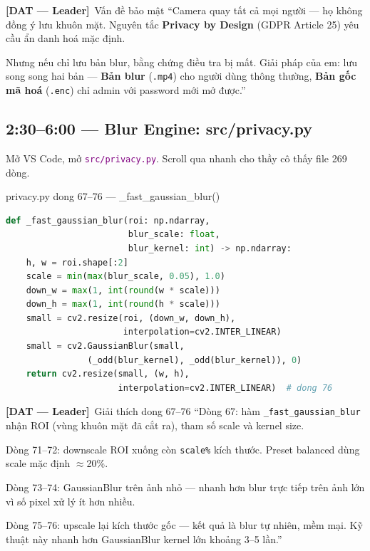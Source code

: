 \documentclass[12pt, a4paper]{article}
\newcommand{\dat}{\textcolor{BrickRed}{\textbf{[DAT --- Leader]}}}
\newcommand{\fpath}[1]{\texttt{\textcolor{purple}{#1}}}
\begin{document}
\begin{dialog}{\dat\ Vấn đề bảo mật}
``Camera quay tất cả mọi người --- họ không đồng ý lưu khuôn mặt.
Nguyên tắc \textbf{Privacy by Design} (GDPR Article 25) yêu cầu ẩn danh hoá mặc định.

Nhưng nếu chỉ lưu bản blur, bằng chứng điều tra bị mất.
Giải pháp của em: lưu song song hai bản ---
\textbf{Bản blur} (\texttt{.mp4}) cho người dùng thông thường,
\textbf{Bản gốc mã hoá} (\texttt{.enc}) chỉ admin với password mới mở được.''
\end{dialog}

\subsection{2:30--6:00 --- Blur Engine: src/privacy.py}

\begin{action}
Mở VS Code, mở \fpath{src/privacy.py}.
Scroll qua nhanh cho thầy cô thấy file 269 dòng.
\end{action}

\begin{codestep}{privacy.py dong 67--76 --- \_fast\_gaussian\_blur()}
\begin{lstlisting}[language=Python, firstnumber=67]
def _fast_gaussian_blur(roi: np.ndarray,
                        blur_scale: float,
                        blur_kernel: int) -> np.ndarray:
    h, w = roi.shape[:2]
    scale = min(max(blur_scale, 0.05), 1.0)
    down_w = max(1, int(round(w * scale)))
    down_h = max(1, int(round(h * scale)))
    small = cv2.resize(roi, (down_w, down_h),
                       interpolation=cv2.INTER_LINEAR)
    small = cv2.GaussianBlur(small,
                (_odd(blur_kernel), _odd(blur_kernel)), 0)
    return cv2.resize(small, (w, h),
                      interpolation=cv2.INTER_LINEAR)  # dong 76
\end{lstlisting}
\end{codestep}

\begin{dialog}{\dat\ Giải thích dong 67--76}
``Dòng 67: hàm \texttt{\_fast\_gaussian\_blur} nhận ROI (vùng khuôn mặt đã cắt ra), tham số scale và kernel size.

Dòng 71--72: downscale ROI xuống còn \texttt{scale\%} kích thước.
Preset balanced dùng scale mặc định $\approx$20\%.

Dòng 73--74: GaussianBlur trên ảnh nhỏ --- nhanh hơn blur trực tiếp trên ảnh lớn
vì số pixel xử lý ít hơn nhiều.

Dòng 75--76: upscale lại kích thước gốc --- kết quả là blur tự nhiên, mềm mại.
Kỹ thuật này nhanh hơn GaussianBlur kernel lớn khoảng 3--5 lần.''
\end{dialog}
\end{document}
